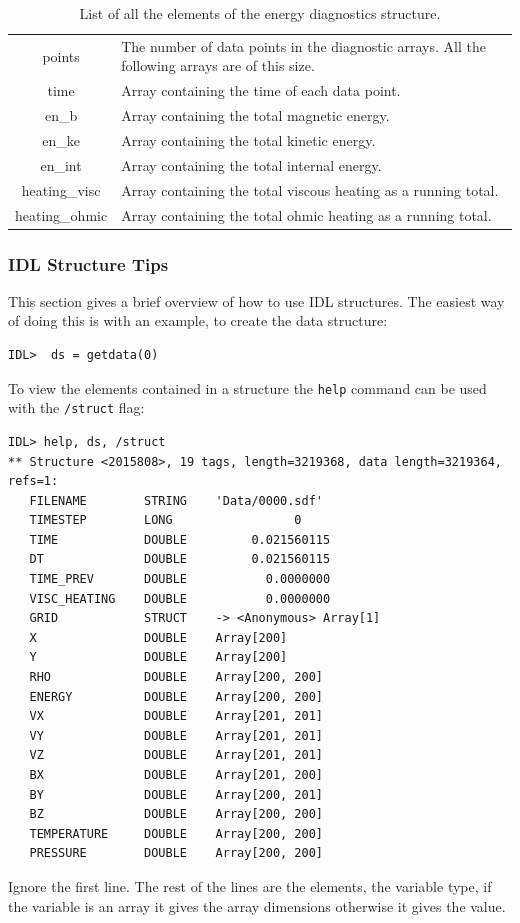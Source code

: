 \documentclass[11pt]{article}
\begin{document}
\begin{table}[!htbp]
\begin{tabular}{|c|p{}|}
\hline
points& The number of data points in the diagnostic arrays. All the following arrays are of this size.\\
time& Array containing the time of each data point.\\
en\_b & Array containing the total magnetic energy.\\
en\_ke & Array containing the total kinetic energy.\\
en\_int&Array containing the total internal energy.\\
heating\_visc& Array containing the total viscous heating as a running total.\\
heating\_ohmic& Array containing the total ohmic heating as a running total.\\
\hline
\end{tabular}
\caption{List of all the elements of the energy diagnostics structure.}
\label{enstructure}
\end{table}

\subsubsection{IDL Structure Tips}
\label{IDLtips}
This section gives a brief overview of how to use IDL structures. The easiest way of doing this is with an example, to create the data structure:
\begin{verbatim}
IDL>  ds = getdata(0)
\end{verbatim}

To view the elements contained in a structure the \texttt{help} command can be used with the \texttt{/struct} flag:
\begin{verbatim}
IDL> help, ds, /struct
** Structure <2015808>, 19 tags, length=3219368, data length=3219364, refs=1:
   FILENAME        STRING    'Data/0000.sdf'
   TIMESTEP        LONG                 0
   TIME            DOUBLE         0.021560115
   DT              DOUBLE         0.021560115
   TIME_PREV       DOUBLE           0.0000000
   VISC_HEATING    DOUBLE           0.0000000
   GRID            STRUCT    -> <Anonymous> Array[1]
   X               DOUBLE    Array[200]
   Y               DOUBLE    Array[200]
   RHO             DOUBLE    Array[200, 200]
   ENERGY          DOUBLE    Array[200, 200]
   VX              DOUBLE    Array[201, 201]
   VY              DOUBLE    Array[201, 201]
   VZ              DOUBLE    Array[201, 201]
   BX              DOUBLE    Array[201, 200]
   BY              DOUBLE    Array[200, 201]
   BZ              DOUBLE    Array[200, 200]
   TEMPERATURE     DOUBLE    Array[200, 200]
   PRESSURE        DOUBLE    Array[200, 200]
\end{verbatim}
Ignore the first line. The rest of the lines are the elements, the variable type, if the variable is an array it gives the array dimensions otherwise it gives the value.
\end{document}
